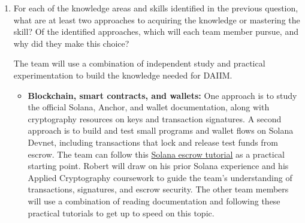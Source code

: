 \documentclass[12pt]{article}
\begin{document}
\begin{enumerate}
  The token economics is another area with which all members do not have or have little experience. 
  As most members do not have experience with Solana, blockchain, or wallets, it naturally follows
  that experience using SOL tokens on blockchain is something that will have to be acquired for the 
  success of the project.

  None of our four members have implemented an embedded Web3 wallet in our previous 
  projects. Our supervisor, Dr. Hassan, made us aware of the availability of the tool for embedding
  the wallet in a way that is more familiar to the average user with no experience with Web3 wallets. 
  This will help support our usability non-functional requirements for the users.

  Additionally, a major part of the project is determining a reliable aggregation algorithm for regression.
  This requires foundational knowledge in theoretical mathematics and precision errors. Malicious providers 
  and collusion attacks also pose a major risk to the system. Understanding methods to combat these risks
  is necessary for the success of the system and completion of the project.


  \item For each of the knowledge areas and skills identified in the previous
  question, what are at least two approaches to acquiring the knowledge or
  mastering the skill?  Of the identified approaches, which will each team
  member pursue, and why did they make this choice?

  The team will use a combination of independent study and practical
  experimentation to build the knowledge needed for DAIIM.

  \begin{itemize}
    \item \textbf{Blockchain, smart contracts, and wallets:} One approach is to
    study the official Solana, Anchor, and wallet documentation, along with
    cryptography resources on keys and transaction signatures. A second
    approach is to build and test small programs and wallet flows on Solana
    Devnet, including transactions that lock and release test funds from
    escrow. The team can follow this
    \href{https://paulx.dev/blog/2021/01/14/programming-on-solana-an-introduction/}
    {Solana escrow tutorial} as a practical starting point. Robert will draw
    on his prior Solana experience and his Applied
    Cryptography coursework to guide the team's understanding of transactions,
    signatures, and escrow security. The other team members will use a combination of
    reading documentation and following these practical tutorials to get up to speed on this topic.


\end{itemize}
\end{enumerate}
\end{document}
